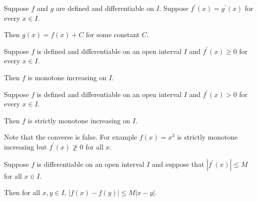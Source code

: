 \begin{corollary}
    Suppose $f$ and $g$ are defined and differentiable on $I$. Suppose 
    $f^\prime(x) = g^\prime(x)$ for every $x\in I$. 

    Then $g(x) = f(x) + C$ for some constant $C$.
\end{corollary}


\begin{corollary}
    Suppose $f$ is defined and differentiable on an open interval $I$ and 
    $f^\prime(x) \geq 0$ for every $x \in I$. 

    Then $f$ is monotone increasing on $I$.
\end{corollary}


\begin{corollary}
    Suppose $f$ is defined and differentiable on an open interval $I$ and 
    $f^\prime(x) > 0$ for every $x \in I$. 

    Then $f$ is strictly monotone increasing on $I$.

    Note that the converse is false. For example $f(x) = x^3$ is strictly monotone 
    increasing but $f^\prime(x) \ngeq 0$ for all $x$.
\end{corollary}


\begin{corollary}
    Suppose $f$ is differentiable on an open interval $I$ and suppose that 
    $|f^\prime(x)| \leq M$ for all $x\in I$.

    Then for all $x,y \in I$, $|f(x) - f(y)| \leq M|x-y|$.
\end{corollary}
